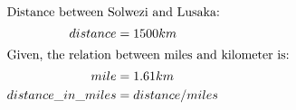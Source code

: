 \documentclass{article}
\begin{document}
	\begin{align}
		\intertext{Distance between Solwezi and Lusaka:}
		distance &= 1500km \\
		\intertext{Given, the relation between miles and kilometer is:}
		mile &= 1.61km \\
		distance\_in\_miles &= distance/miles
	\end{align}
\end{document}
